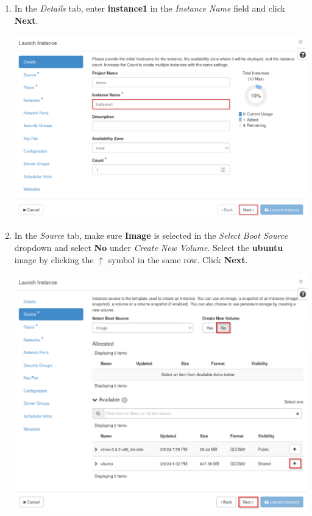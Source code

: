 \documentclass[letterpaper, 12pt]{article}
\begin{document}
\begin{enumerate}
    \item In the \textit{Details} tab, enter \textbf{instance1} in the \textit{Instance Name} field and click
    \textbf{Next}.

    \begin{center}
        \includegraphics[width=\linewidth]{images/part1/step5.png}
    \end{center}

    \item In the \textit{Source} tab, make sure \textbf{Image} is selected in the \textit{Select Boot Source} dropdown
    and select \textbf{No} under \textit{Create New Volume}. Select the \textbf{ubuntu} image by clicking the $\uparrow$
    symbol in the same row. Click \textbf{Next}.

    \begin{center}
        \includegraphics[width=\linewidth]{images/part1/step6.png}
    \end{center}


\end{enumerate}
\end{document}
